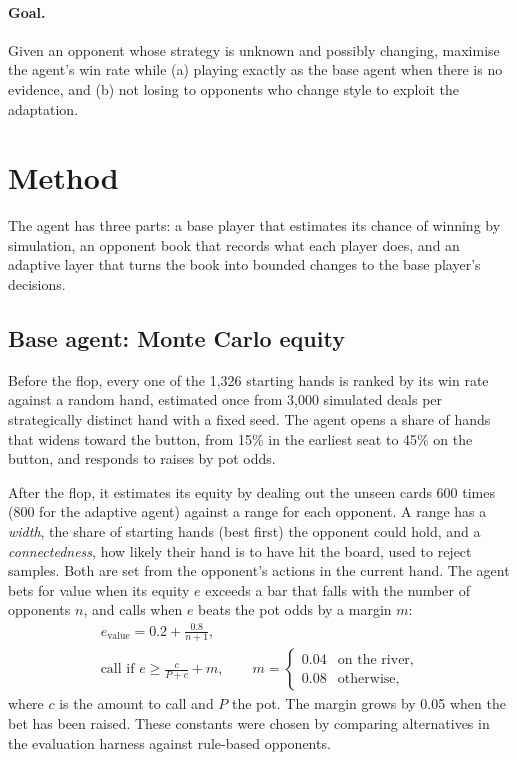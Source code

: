 \paragraph{Goal.} Given an opponent whose strategy is unknown and possibly changing,
maximise the agent's win rate while (a) playing exactly as the base agent when there is no
evidence, and (b) not losing to opponents who change style to exploit the adaptation.

\section{Method}

The agent has three parts: a base player that estimates its chance of winning by
simulation, an opponent book that records what each player does, and an adaptive layer that
turns the book into bounded changes to the base player's decisions.

\subsection{Base agent: Monte Carlo equity}

Before the flop, every one of the 1,326 starting hands is ranked by its win rate against a
random hand, estimated once from 3,000 simulated deals per strategically distinct hand with a
fixed seed. The agent opens a share of hands that widens toward the button, from 15\% in the
earliest seat to 45\% on the button, and responds to raises by pot odds.

After the flop, it estimates its equity by dealing out the unseen cards 600 times (800 for the
adaptive agent) against a range for each opponent. A range has a \emph{width}, the share of
starting hands (best first) the opponent could hold, and a \emph{connectedness}, how likely
their hand is to have hit the board, used to reject samples. Both are set from the
opponent's actions in the current hand. The agent bets for value when its equity $e$
exceeds a bar that falls with the number of opponents $n$, and calls when $e$ beats the pot
odds by a margin $m$:
\begin{gather}
e_{\text{value}} = 0.2 + \frac{0.8}{n+1}, \\
\text{call if } e \ge \frac{c}{P+c} + m, \qquad
m = \begin{cases} 0.04 & \text{on the river,}\\ 0.08 & \text{otherwise,}\end{cases}
\end{gather}
where $c$ is the amount to call and $P$ the pot. The margin grows by 0.05 when the bet has
been raised. These constants were chosen by comparing alternatives in the evaluation harness
against rule-based opponents.

